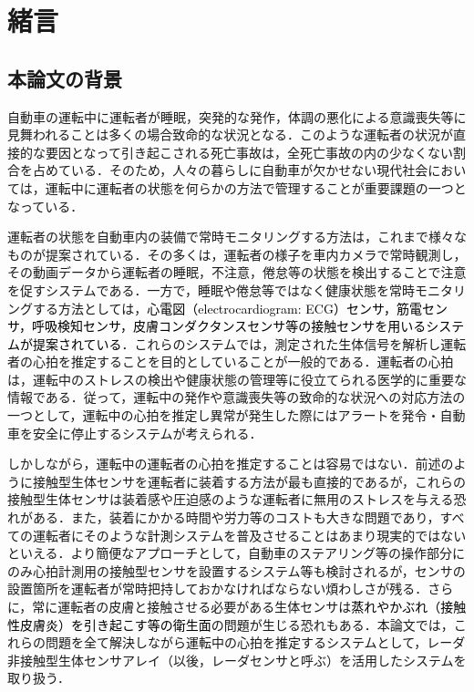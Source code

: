 \chapter{緒言}
\label{chap:intro}

\section{本論文の背景}
自動車の運転中に運転者が睡眠，突発的な発作，体調の悪化による意識喪失等に見舞われることは多くの場合致命的な状況となる．このような運転者の状況が直接的な要因となって引き起こされる死亡事故は，全死亡事故の内の少なくない割合を占めている\cite{traficaccident}．そのため，人々の暮らしに自動車が欠かせない現代社会においては，運転中に運転者の状態を何らかの方法で管理することが重要課題の一つとなっている．

運転者の状態を自動車内の装備で常時モニタリングする方法は，これまで様々なものが提案されている\cite{sensorreview}．その多くは，運転者の様子を車内カメラで常時観測し，その動画データから運転者の睡眠，不注意，倦怠等の状態を検出することで注意を促すシステムである\cite{system1, system2, system3}．一方で，睡眠や倦怠等ではなく健康状態を常時モニタリングする方法としては，\textcolor{black}{心電図（electrocardiogram: ECG）センサ，筋電センサ，呼吸検知センサ，皮膚コンダクタンスセンサ等の接触センサを用いるシステムが提案されている}\cite{contactsensor1, contactsensor2}．これらのシステムでは，測定された生体信号を解析し運転者の心拍を推定することを目的としていることが一般的である．運転者の心拍は，運転中のストレスの検出や健康状態の管理等に役立てられる医学的に重要な情報である．従って，運転中の発作や意識喪失等の致命的な状況への対応方法の一つとして，運転中の心拍を推定し異常が発生した際にはアラートを発令・自動車を安全に停止するシステムが考えられる．

しかしながら，運転中の運転者の心拍を推定することは容易ではない．前述のように接触型生体センサを運転者に装着する方法が最も直接的であるが，これらの接触型生体センサは装着感や圧迫感のような運転者に無用のストレスを与える恐れがある．また，装着にかかる時間や労力等のコストも大きな問題であり，すべての運転者にそのような\textcolor{black}{計測}システムを普及させることはあまり現実的ではないといえる．より簡便なアプローチとして，自動車のステアリング等の操作部分にのみ心拍計測用の接触型センサを設置するシステム\cite{eazyap1, eazyap2, eazyap3}等も検討されるが，センサの設置箇所を運転者が常時把持しておかなければならない煩わしさが残る．さらに，常に運転者の皮膚と接触させる必要がある生体センサは\textcolor{black}{蒸れやかぶれ（接触性皮膚炎）を引き起こす等の衛生面}の問題が生じる恐れもある．本論文では，これらの問題を全て解決しながら運転中の心拍を推定するシステムとして，レーダ非接触型生体センサアレイ（以後，レーダセンサと呼ぶ）を活用したシステムを取り扱う．

